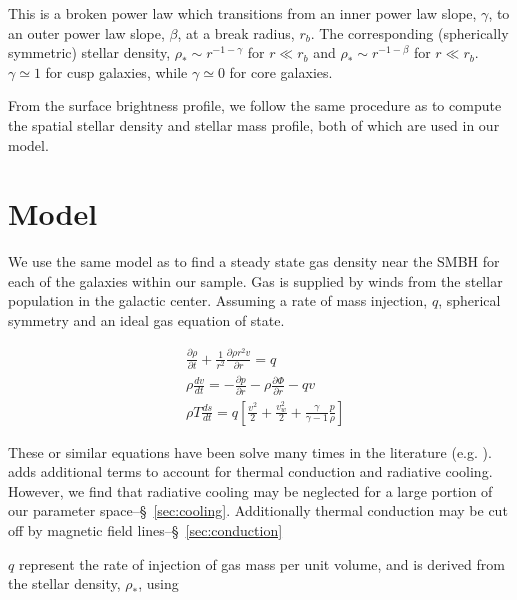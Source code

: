 \documentclass[usenatbib,fleqn]{mn2e}
\newcommand{\rb}{r_b}
\newcommand{\dxdy}[2]{\frac{\partial #1}{\partial #2} }
\newcommand{\drhodt}{\dxdy{\rho}{t}}
\newcommand{\dpdr}{\dxdy{p}{r}}
\newcommand{\dphidr}{\dxdy{\Phi}{r}}
\newcommand{\ke}{\frac{v^2}{2}}
\newcommand{\kew}{\frac{v_w^2}{2}}
\newcommand{\gammaf}{\frac{\gamma}{\gamma-1}}
\newcommand{\cs}{\frac{p}{\rho}}
\newcommand{\rhostar}{\rho_*}
\begin{document}
This is a broken power law which transitions from an inner power law slope, $\gamma$, to an outer power law slope, $\beta$, at a break radius, $\rb$.  The corresponding (spherically symmetric) stellar density, $\rhostar\sim r^{-1-\gamma}$ for $r \ll \rb$ and  $\rhostar\sim r^{-1-\beta}$ for $r \ll \rb$.  $\gamma\simeq1$ for cusp galaxies, while $\gamma\simeq0$ for core galaxies.

From the surface brightness profile, we follow the same procedure as  to compute the spatial stellar density and stellar mass profile, both of which are used in our model. 


\section{Model}
\label{sec:model}
We use the same model as \citealt{Quataert:2004a} to find a steady state gas density near the SMBH for each of the galaxies within our sample.  Gas is supplied by winds from the stellar population in the galactic center. Assuming a rate of mass injection, $q$, spherical symmetry and an ideal gas equation of state. 

\begin{align}
&\drhodt+\frac{1}{r^2}\dxdy{\rho r^2 v}{r}=q\\
&\rho \frac{dv}{dt}=-\dpdr-\rho \dphidr-q v\\
&\rho T \frac{ds}{dt}=q\left[\ke+\kew+\gammaf \cs \right]
\end{align}

These or similar equations have been solve many times in the literature (e.g. \citealt{HolzerAxford:1970a,Quataert:2004a,De-ColleGuillochon+:2012a,ShcherbakovWong+:2014a}). \citealt{ShcherbakovWong+:2014a} adds additional terms to account for thermal conduction and radiative cooling. However, we find that radiative cooling may be neglected for a large portion of our parameter space--\S~\ref{sec:cooling}.  Additionally thermal conduction may be cut off by magnetic field lines--\S~\ref{sec:conduction}

$q$ represent the rate of injection of gas mass per unit volume, and is derived from the stellar density, $\rho_*$, using
\end{document}
